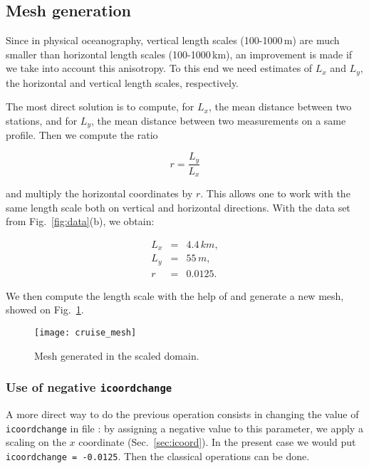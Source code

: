 \subsection{Mesh generation\label{sec:meshscale}}



Since in physical oceanography, vertical length scales (100-1000\,m) are much smaller than horizontal length scales (100-1000\,km), an improvement is  made if we take into account this anisotropy. To this end we need estimates of $L_{x}$ and $L_{y}$, the horizontal and vertical length scales, respectively.


The most direct solution is to compute, for $L_{x}$, the mean distance between two stations, and for $L_{y}$, the mean distance between two measurements on a same profile. Then we compute the ratio

\[r = \frac{L_y}{L_x}\]

and multiply the horizontal coordinates by $r$. This allows one to work with the same length scale both on vertical and horizontal directions. With the  data set from Fig.~\ref{fig:data}(b), we obtain:

\begin{eqnarray*}
L_{x} &=& 4.4\,km,\\
L_{y} &=& 55\,m,\\
	r   &=& 0.0125.
\end{eqnarray*}

We then compute the length scale with the help of  and generate a new mesh, showed on Fig.~\ref{fig:mesh}. 

\begin{figure}[H]
\centering
\texttt{[image: cruise\_mesh]}
\caption{Mesh generated in the scaled domain.\label{fig:mesh}}
\end{figure}

\subsubsection{Use of negative \texttt{icoordchange}}

A more direct way to do the previous operation consists in changing the value of \texttt{icoord\-change} in file : by assigning a negative value to this parameter, we apply a scaling on the $x$ coordinate (Sec.~\ref{sec:icoord}). In the present case we would put\, \texttt{icoordchange = -0.0125}. Then the classical \diva operations can be done.



